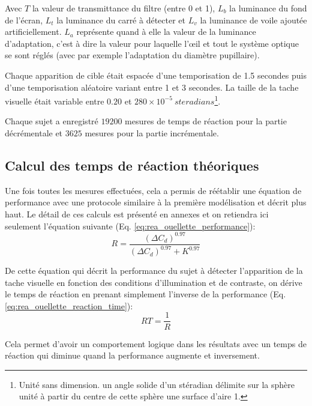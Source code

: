 	\par Avec $T$ la valeur de transmittance du filtre (entre 0 et 1), $L_b$ la luminance du fond de l'écran, $L_t$ la luminance du carré à détecter et $L_v$ la luminance de voile ajoutée artificiellement. $L_a$ représente quand à elle la valeur de la luminance d'adaptation, c'est à dire la valeur pour laquelle l'œil et tout le système optique se sont réglés (avec par exemple l'adaptation du diamètre pupillaire).
	
	\par Chaque apparition de cible était espacée d'une temporisation de 1.5 secondes puis d'une temporisation aléatoire variant entre 1 et 3 secondes. La taille de la tache visuelle était variable entre $0.20$ et $280 \times 10^{-5}~steradians$\footnote{Unité sans dimension. un angle solide d'un stéradian délimite sur la sphère unité à partir du centre de cette sphère une surface d'aire 1.}.
	
	\par Chaque sujet a enregistré $19200$ mesures de temps de réaction pour la partie décrémentale et $3625$ mesures pour la partie incrémentale.
	
	\subsection{Calcul des temps de réaction théoriques}
	\par Une fois toutes les mesures effectuées, cela a permis de réétablir une équation de performance avec une protocole similaire à la première modélisation et décrit plus haut. Le détail de ces calculs est présenté en annexes et on retiendra ici seulement l'équation suivante (Eq. \ref{eq:rea_ouellette_performance}):
	\begin{equation}
		R = \frac{(\Delta C_d)^{0.97}}{(\Delta C_d)^{0.97} + K^{0.97}}
		\label{eq:rea_ouellette_performance}
	\end{equation}
	
	\par De cette équation qui décrit la performance du sujet à détecter l'apparition de la tache visuelle en fonction des conditions d'illumination et de contraste, on dérive le temps de réaction en prenant simplement l'inverse de la performance (Eq. \ref{eq:rea_ouellette_reaction_time}):
	\begin{equation}
		RT = \frac{1}{R}
		\label{eq:rea_ouellette_reaction_time}
	\end{equation}
	
	\par Cela permet d'avoir un comportement logique dans les résultats avec un temps de réaction qui diminue quand la performance augmente et inversement.
	
